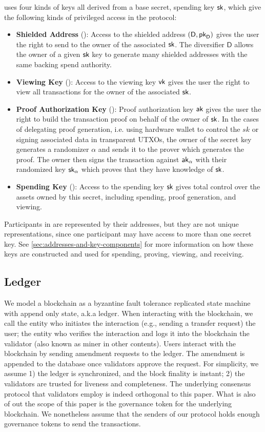 \MantaPay{} uses four kinds of keys all derived from a base secret, spending key ${\textsf{sk}}$, which give the following kinds of privileged access in the protocol:

\begin{itemize}
    \item \textbf{Shielded Address} (\send{}): Access to the shielded address $(\textsf{D}, {\textsf{pk}}_\textsf{D})$ gives the user the right to send  to the owner of the associated ${\textsf{sk}}$. The diversifier $\textsf{D}$ allows the owner of a given ${\textsf{sk}}$ key to generate many shielded addresses with the same backing spend authority.
    \item \textbf{Viewing Key} (\view{}): Access to the viewing key ${\textsf{vk}}$ gives the user the right to view all transactions for the owner of the associated ${\textsf{sk}}$.
    \item \textbf{Proof Authorization Key} (\prove{}): Proof authorization key ${\textsf{ak}}$ gives the user the right to build the transaction proof on behalf of the owner of ${\textsf{sk}}$. 
    In the cases of delegating proof generation, i.e. using hardware wallet to control the $sk$ or signing associated data in transparent UTXOs, 
    the owner of the secret key generates a randomizer $\alpha$ and sends it to the prover which generates the proof. The owner then signs the transaction against ${\textsf{ak}}_\alpha$ with their randomized key ${\textsf{sk}}_\alpha$ which proves that they have knowledge of ${\textsf{sk}}$.
    \item \textbf{Spending Key} (\spend{}): Access to the spending key ${\textsf{sk}}$ gives total control over the assets owned by this secret, including spending, proof generation, and viewing.
\end{itemize}

Participants in \MantaPay{} are represented by their addresses, but they are not unique representations, since one participant may have access to more than one secret key. See \autoref{sec:addresses-and-key-components} for more information on how these keys are constructed and used for spending, proving, viewing, and receiving.

\subsection{Ledger}

We model a blockchain as a byzantine fault tolerance replicated state
machine with append only state, a.k.a ledger. When interacting with the blockchain, we call the entity who
initiates the interaction (e.g., sending a transfer request) the user; the entity who verifies the interaction and
logs it into the blockchain the validator (also known as miner in other contents). Users interact with the
blockchain by sending amendment requests to the ledger. The amendment is appended to the database once
validators approve the request. For simplicity, we assume 1) the ledger is synchronized, and the block finality
is instant; 2) the validators are trusted for liveness and completeness. The underlying consensus protocol
that validators employ is indeed orthogonal to this paper. What is also of out the scope of this paper is
the governance token for the underlying blockchain. We nonetheless assume that the senders of our protocol
holds enough governance tokens to send the transactions.

